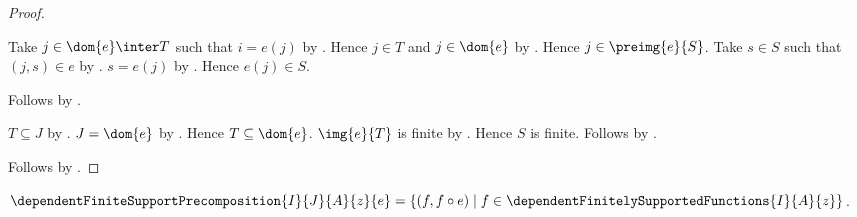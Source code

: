 \begin{proof}
\begin{subproof}
\begin{subproof}
\begin{subproof}
                Take $j\in\dom{e}\inter T$ such that $i=e(j)$ by
                    .
                Hence $j\in T$ and $j\in\dom{e}$ by .
                Hence $j\in\preimg{e}{S}$.
                Take $s\in S$ such that $(j,s)\in e$ by
                    .
                $s=e(j)$ by
                    .
                Hence $e(j)\in S$.
            \end{subproof}
            Follows by .
        \end{subproof}
        $T\subseteq J$ by .
        $J=\dom{e}$ by .
        Hence $T\subseteq\dom{e}$.
        $\img{e}{T}$ is finite by
            .
        Hence $S$ is finite.
        Follows by .
    \end{subproof}
    Follows by \auto.
\end{proof}

\begin{definition}\label{dependent_finite_support_precomposition}
    $\dependentFiniteSupportPrecomposition{I}{J}{A}{z}{e}
        =\{(f,f\circ e)\mid
            f\in\dependentFinitelySupportedFunctions{I}{A}{z}\}$.
\end{definition}

